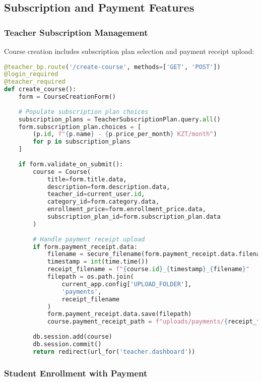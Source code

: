 \subsection{Subscription and Payment Features}

\subsubsection{Teacher Subscription Management}

Course creation includes subscription plan selection and payment receipt upload:

\begin{lstlisting}[language=Python, caption=Course Creation with Subscription, label=lst:subscription-management]
@teacher_bp.route('/create-course', methods=['GET', 'POST'])
@login_required
@teacher_required
def create_course():
    form = CourseCreationForm()
    
    # Populate subscription plan choices
    subscription_plans = TeacherSubscriptionPlan.query.all()
    form.subscription_plan.choices = [
        (p.id, f"{p.name} - {p.price_per_month} KZT/month") 
        for p in subscription_plans
    ]
    
    if form.validate_on_submit():
        course = Course(
            title=form.title.data,
            description=form.description.data,
            teacher_id=current_user.id,
            category_id=form.category.data,
            enrollment_price=form.enrollment_price.data,
            subscription_plan_id=form.subscription_plan.data
        )
        
        # Handle payment receipt upload
        if form.payment_receipt.data:
            filename = secure_filename(form.payment_receipt.data.filename)
            timestamp = int(time.time())
            receipt_filename = f"{course.id}_{timestamp}_{filename}"
            filepath = os.path.join(
                current_app.config['UPLOAD_FOLDER'], 
                'payments', 
                receipt_filename
            )
            form.payment_receipt.data.save(filepath)
            course.payment_receipt_path = f"uploads/payments/{receipt_filename}"
        
        db.session.add(course)
        db.session.commit()
        return redirect(url_for('teacher.dashboard'))
\end{lstlisting}

\subsubsection{Student Enrollment with Payment}

